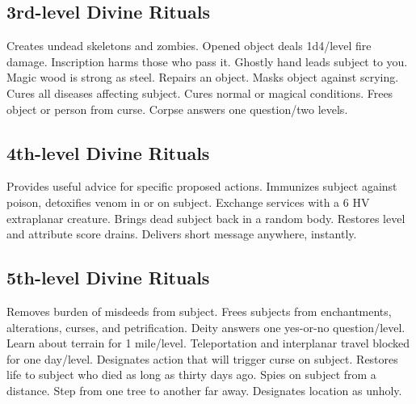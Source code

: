 \subsection{3rd-level Divine Rituals}
\begin{rituallist}
   Creates undead skeletons and zombies.
   Opened object deals 1d4/level fire damage.
  \M Inscription harms those who pass it.
   Ghostly hand leads subject to you.
   Magic wood is strong as steel.
   Repairs an object.
   Masks object against scrying.
   Cures all diseases affecting subject.
   Cures normal or magical conditions.
   Frees object or person from curse.
   Corpse answers one question/two levels.
\end{rituallist}

\subsection{4th-level Divine Rituals}
\begin{rituallist}
   Provides useful advice for specific proposed actions.
   Immunizes subject against poison, detoxifies venom in or on subject.
   Exchange services with a 6 HV extraplanar creature.
   Brings dead subject back in a random body.
   Restores level and attribute score drains.
   Delivers short message anywhere, instantly.
\end{rituallist}

\subsection{5th-level Divine Rituals}
\begin{rituallist}
  \F\M Removes burden of misdeeds from subject.
   Frees subjects from enchantments, alterations, curses, and petrification.
   Deity answers one yes-or-no question/level.
   Learn about terrain for 1 mile/level.
   Teleportation and interplanar travel blocked for one day/level.
   Designates action that will trigger curse on subject.
   Restores life to subject who died as long as thirty days ago.
  \F Spies on subject from a distance.
   Step from one tree to another far away.
   Designates location as unholy.
\end{rituallist}

